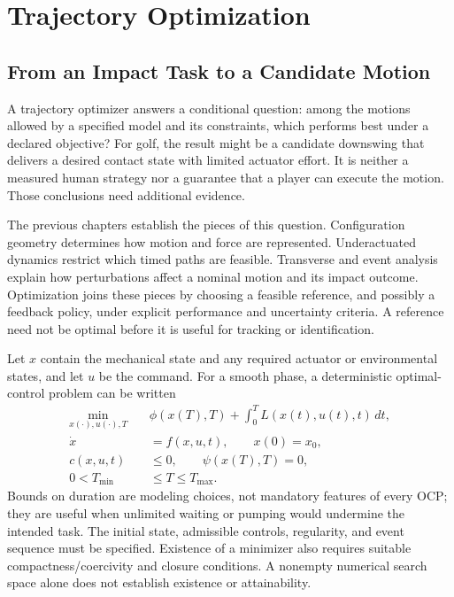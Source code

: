\documentclass[12pt, openany]{book}
\theoremstyle{plain}
\begin{document}
\setcounter{chapter}{5}

\chapter{Trajectory Optimization}
\label{ch:trajectory_optimization}

\section{From an Impact Task to a Candidate Motion}

A trajectory optimizer answers a conditional question: among the motions
allowed by a specified model and its constraints, which performs best under
a declared objective? For golf, the result might be a candidate downswing
that delivers a desired contact state with limited actuator effort. It is
neither a measured human strategy nor a guarantee that a player can execute
the motion. Those conclusions need additional evidence.

The previous chapters establish the pieces of this question. Configuration
geometry determines how motion and force are represented. Underactuated
dynamics restrict which timed paths are feasible. Transverse and event
analysis explain how perturbations affect a nominal motion and its impact
outcome. Optimization joins these pieces by choosing a feasible reference,
and possibly a feedback policy, under explicit performance and uncertainty
criteria. A reference need not be optimal before it is useful for tracking
or identification.

Let $x$ contain the mechanical state and any required actuator or environmental
states, and let $u$ be the command. For a smooth phase, a deterministic
optimal-control problem can be written
\begin{equation}\label{eq:ocp_cost}
\begin{aligned}
 \min_{x(\cdot),u(\cdot),T}\quad &
 \phi(x(T),T)+\int_0^T L(x(t),u(t),t)\,dt,\\
 \dot x&=f(x,u,t),\qquad x(0)=x_0,\\
 c(x,u,t)&\leq0,\qquad \psi(x(T),T)=0,\\
 0<T_{\min}&\leq T\leq T_{\max}.
\end{aligned}
\end{equation}
Bounds on duration are modeling choices, not mandatory features of every
OCP; they are useful when unlimited waiting or pumping would undermine the
intended task. The initial state, admissible controls, regularity, and event
sequence must be specified. Existence of a minimizer also requires suitable
compactness/coercivity and closure conditions. A nonempty numerical search
space alone does not establish existence or attainability.
\end{document}
